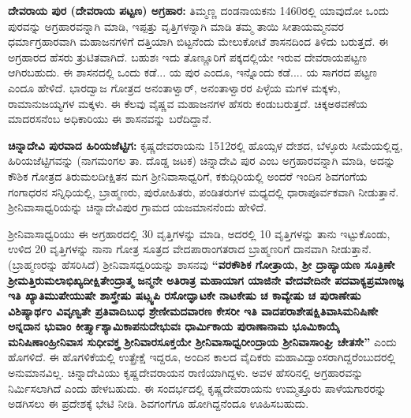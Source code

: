 \textbf{ದೇವರಾಯ ಪುರ (ದೇವರಾಯ ಪಟ್ಟಣ) ಅಗ್ರಹಾರ:} ತಿಮ್ಮಣ್ಣ ದಂಡನಾಯಕನು 1460ರಲ್ಲಿ ಯಾವುದೋ ಒಂದು ಪುರವನ್ನು ಅಗ್ರಹಾರವನ್ನಾಗಿ ಮಾಡಿ, ಇಪ್ಪತ್ತು ವೃತ್ತಿಗಳನ್ನಾಗಿ ಮಾಡಿ ತಮ್ಮ ತಾಯಿ ಸೀತಾಯಮ್ಮನವರ ಧರ್ಮಾಗ್ರಹಾರವಾಗಿ ಮಹಾಜನಗಳಿಗೆ ದತ್ತಿಯಾಗಿ ಬಿಟ್ಟನೆಂದು ಮೇಲುಕೋಟೆ ಶಾಸನದಿಂದ ತಿಳಿದು ಬರುತ್ತದೆ. ಈ ಅಗ್ರಹಾರದ ಹೆಸರು ತ್ರುಟಿತವಾಗಿದೆ. ಬಹುಶಃ ಇದು ತೊಣ್ಣೂರಿಗೆ ಪಕ್ಕದಲ್ಲಿಯೇ ಇರುವ ದೇವರಾಯಪಟ್ಟಣ ಆಗಿರಬಹುದು. ಈ ಶಾಸನದಲ್ಲಿ ಒಂದು ಕಡೆ... ಯ ಪುರ ಎಂದೂ, ಇನ್ನೊಂದು ಕಡೆ.... ಯ ಸಾಗರದ ಪಟ್ಟಣ ಎಂದೂ ಹೇಳಿದೆ. ಭಾರದ್ವಾಜ ಗೋತ್ರದ ಅನಂತಾಳ್ವಾರ್​, ಅನಂತಾಳ್ವಾರರ ಪಿಳ್ಳೆಯ ಮಗಳ ಮಕ್ಕಳು, ರಾಮಾನುಜಯ್ಯಗಳ ಮಕ್ಕಳು. ಈ ಕೆಲವು ವೈಷ್ಣವ ಮಹಾಜನಗಳ ಹೆಸರು ಕಂಡುಬರುತ್ತದೆ. ಚಿಕ್ಕಅಠವಣೆಯ ಮಾದರಸನೆಂಬ ಅಧಿಕಾರಿಯು ಈ ಶಾಸನವನ್ನು ಬರೆದಿದ್ದಾನೆ.

\textbf{ಚಿನ್ನಾದೇವಿ ಪುರವಾದ ಹಿರಿಯಜೆಟ್ಟಿಗ:} ಕೃಷ್ಣದೇವರಾಯನು 1512ರಲ್ಲಿ ಹೊಯ್ಸಳ ದೇಶದ, ಬೆಳ್ಳೂರು ಸೀಮೆ\-ಯಲ್ಲಿದ್ದ, ಹಿರಿಯಜೆಟ್ಟಿಗವನ್ನು (ನಾಗಮಂಗಲ ತಾ. ದೊಡ್ಡ ಜಟಕ) ಚಿನ್ನಾದೇವಿ ಪುರ ಎಂಬ ಅಗ್ರಹಾರವನ್ನಾಗಿ ಮಾಡಿ, ಅದನ್ನು ಕೌಶಿಕ ಗೋತ್ರದ ತಿರುಮಲದೀಕ್ಷಿತನ ಮಗ ಶ‍್ರೀನಿವಾಸಾಧ್ವರಿಗೆ, ಕಕುದ್ಗಿರಿಯಲ್ಲಿ ಅಂದರೆ ಇಂದಿನ ಶಿವಗಂಗೆಯ ಗಂಗಾಧರನ ಸನ್ನಿಧಿಯಲ್ಲಿ, ಬ್ರಾಹ್ಮಣರು, ಪುರೋಹಿತರು, ಪಂಡಿತರುಗಳ ಮಧ್ಯದಲ್ಲಿ ಧಾರಾಪೂರ್ವಕವಾಗಿ ನೀಡುತ್ತಾನೆ. ಶ‍್ರೀನಿವಾಸಾಧ್ವರಿಯನ್ನು ಚಿನ್ನಾದೇವಿಪುರ ಗ್ರಾಮದ ಯಜಮಾನನೆಂದು ಹೇಳಿದೆ.

ಶ‍್ರೀನಿವಾಸಾಧ್ವರಿಯು ಈ ಅಗ್ರಹಾರದಲ್ಲಿ 30 ವೃತ್ತಿಗಳನ್ನು ಮಾಡಿ, ಅದರಲ್ಲಿ 10 ವೃತ್ತಿಗಳನ್ನು ತಾನು ಇಟ್ಟುಕೊಂಡು, ಉಳಿದ 20 ವೃತ್ತಿಗಳನ್ನು ನಾನಾ ಗೋತ್ರ ಸೂತ್ರದ ವೇದಪಾರಾಂಗತರಾದ ಬ್ರಾಹ್ಮಣರಿಗೆ ದಾನವಾಗಿ ನೀಡುತ್ತಾನೆ. (ಬ್ರಾಹ್ಮಣರನ್ನು ಹೆಸರಿಸಿದೆ) ಶ‍್ರೀನಿವಾಸಧ್ವರಿಯನ್ನು ಶಾಸನವು \textbf{“ವರಕೌಶಿಕ ಗೋತ್ರಾಯ, ಶ‍್ರೀ ದ್ರಾಹ್ಯಾಯಣ ಸೂತ್ರಿಣೇ\general{\break } ಶ‍್ರೀಮತ್ತಿರುಮಲಾಭಿಖ್ಯದೀಕ್ಷಿತೇಂದ್ರಾತ್ಮ ಜನ್ಮನೇ ಅತಿರಾತ್ರ ಮಹಾಯಾಗ ಯಾಜಿನೇ ವೇದವೇದಿನೇ ಪದವಾಕ್ಯಪ್ರಮಾಣಜ್ಞ ಇತಿ ಖ್ಯಾತಿಮುಪೇಯುಷೇ ಶಾಸ್ತ್ರೇಷು ಷಟ್ಸ್ವಪಿ ರಸೋದ್ಘಾಟಕೇ ನಾಟಕೇಷು ಚ ಕಾವ್ಯೇಷು ಚ ಪುರಾಣೇಷು ವಿಶಿಷ್ಯಾರ್ಥಂ ವಿವೃಣ್ವತೇ ಪ್ರತಿವಾದಿಬುಧ ಶ್ರೇಣೀಮದವಾರಣ ಕೇಸರೀ ಇತಿ ವಾದಪರಾಶೇಷಕ್ಷಿತಿವಾಸಿಮನಿಷಿಣೇ ಅನ್ನದಾನ ಭುವಾಂ ಕೀರ್ತ್ತ್ಯಾಶ್ಯಾಮಿಕಾಪನುದೇಭುವಃ ಧಾರ್ಮಿಕಾಯ ಪುರಾಣಾನಾಮ ಭೂಮಿಕಾಯೈ ಮನಿಷಿಣಾಂಹ್ರೀನಿವಾಸ\general{\break } ಸುಧೀವಕ್ತ್ರ ಶ‍್ರೀನಿವಾರಸೂಕ್ತಯೇ ಶ‍್ರೀನಿವಾಸಾಧ್ವರೀಂದ್ರಾಯ ಶ‍್ರೀನಿವಾಸಾಂಘ್ರಿ ಚೇತಸೇ”} ಎಂದು ಹೊಗಳಿದೆ. ಈ ಹೊಗಳಿಕೆಯಲ್ಲಿ ಉತ್ಪ್ರೇಕ್ಷೆ ಇದ್ದರೂ, ಅಂದಿನ ಕಾಲದ ವೈದಿಕರು ಮಹಾವಿದ್ವಾಂಸರಾಗಿದ್ದರೆಂಬುದರಲ್ಲಿ ಅನುಮಾನವಿಲ್ಲ. ಚಿನ್ನಾದೇವಿಯು ಕೃಷ್ಣದೇವರಾಯನ ರಾಣಿಯಾಗಿದ್ದಳು. ಅವಳ ಹೆಸರಿನಲ್ಲಿ ಅಗ್ರಹಾರವನ್ನು ನಿರ್ಮಿಸಲಾಗಿದೆ ಎಂದು ಹೇಳಬಹುದು. ಈ ಸಂದರ್ಭದಲ್ಲಿ ಕೃಷ್ಣದೇವರಾಯನು ಉಮ್ಮತ್ತೂರು ಪಾಳೆಯಗಾರರನ್ನು ಅಡಗಿಸಲು ಈ ಪ್ರದೇಶಕ್ಕೆ ಭೇಟಿ ನೀಡಿ. ಶಿವಗಂಗೆಗೂ ಹೋಗಿದ್ದನೆಂದೂ ಊಹಿಸಬಹುದು.

